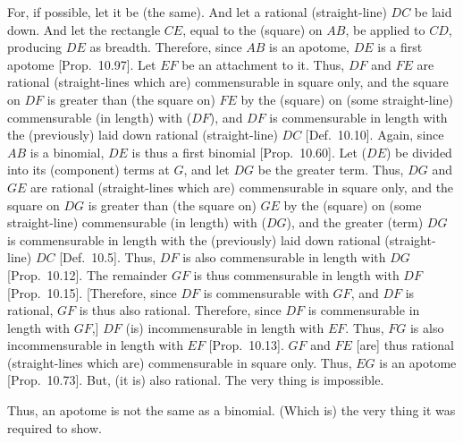 \begin{Parallel}{}{}
{For, if possible, let it be (the same). And let a rational (straight-line)
$DC$ be laid down. And let the rectangle $CE$, equal to the (square) on $AB$, be applied to $CD$, producing $DE$ as breadth. Therefore,
since $AB$ is an apotome, $DE$ is a first apotome [Prop.~10.97]. Let $EF$ be an attachment to it.
Thus, $DF$ and $FE$ are rational (straight-lines which are) commensurable
in square only, and the square on $DF$ is greater than (the square on)
$FE$ by the (square) on (some straight-line) commensurable (in length)
with ($DF$), and $DF$ is commensurable in length with the (previously)
laid down rational (straight-line) $DC$ [Def.~10.10]. 
Again, since $AB$ is a binomial, $DE$ is thus a first binomial [Prop.~10.60]. Let ($DE$) be divided
into its (component) terms at $G$, and let $DG$ be the greater term.
Thus, $DG$ and $GE$ are rational (straight-lines which are)
commensurable in square only, and the square on $DG$ is greater
than (the square on) $GE$ by the (square) on (some straight-line)
commensurable (in length) with ($DG$), and the greater (term)
$DG$ is commensurable in length with the (previously)
laid down rational (straight-line) $DC$ [Def.~10.5].
Thus, $DF$ is also commensurable in length with $DG$ [Prop.~10.12].
The remainder $GF$ is thus commensurable in length with $DF$
[Prop.~10.15]. [Therefore, since
$DF$ is commensurable with $GF$, and $DF$ is rational, $GF$
is thus also rational. Therefore, since $DF$ is commensurable
in length with $GF$,] $DF$ (is) incommensurable in length with $EF$.
Thus, $FG$ is also incommensurable in length with $EF$ [Prop.~10.13]. $GF$ and $FE$ [are] thus
rational (straight-lines which are) commensurable in square only.
Thus, $EG$ is an apotome [Prop.~10.73].
But, (it is) also rational. The very thing is impossible.

Thus, an apotome is not the same as a binomial. (Which is) the very thing
it was required to show.}
\end{Parallel}

